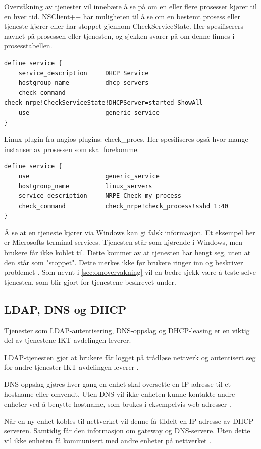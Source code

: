 Overvåkning av tjenester vil innebære å se på om en eller flere prosesser kjører til en hver tid. NSClient++ har muligheten til å se om en bestemt prosess eller tjeneste kjører eller har stoppet gjennom CheckServiceState. Her spesifiserers navnet på prosessen eller tjenesten, og sjekken svarer på om denne finnes i prosesstabellen.
\begin{lstlisting}[style=example]
define service {
    service_description     DHCP Service
    hostgroup_name          dhcp_servers
    check_command           check_nrpe!CheckServiceState!DHCPServer=started ShowAll
    use                     generic_service
}
\end{lstlisting}
Linux-plugin fra nagios-plugins: check\_procs. Her spesifiseres også hvor mange instanser av prosessen som skal forekomme. 
\begin{lstlisting}[style=example]
define service {
    use            	        generic_service
    hostgroup_name       	linux_servers
    service_description     NRPE Check my process
    check_command        	check_nrpe!check_process!sshd 1:40
}
\end{lstlisting}

Å se at en tjeneste kjører via Windows kan gi falsk informasjon. Et eksempel her er Microsofts terminal services. Tjenesten står som kjørende i Windows, men brukere får ikke koblet til. Dette kommer av at tjenesten har hengt seg, uten at den står som "stoppet". Dette merkes ikke før brukere ringer inn og beskriver problemet \cite{serviceproblem}. Som nevnt i \ref{sec:omovervakning} vil en bedre sjekk være å teste selve tjenesten, som blir gjort for tjenestene beskrevet under.

\subsection{LDAP, DNS og DHCP}
Tjenester som LDAP-autentisering, DNS-oppslag og DHCP-leasing er en viktig del av tjenestene IKT-avdelingen leverer.

LDAP-tjenesten gjør at brukere får logget på trådløse nettverk og autentisert seg for andre tjenester IKT-avdelingen leverer \cite{ldap}.

DNS-oppslag gjøres hver gang en enhet skal oversette en IP-adresse til et hostname eller omvendt. Uten DNS vil ikke enheten kunne kontakte andre enheter ved å benytte hostname, som brukes i eksempelvis web-adresser \cite{dns}. 

Når en ny enhet kobles til nettverket vil denne få tildelt en IP-adresse av DHCP-serveren. Samtidig får den informasjon om gateway og DNS-servere. Uten dette vil ikke enheten få kommunisert med andre enheter på nettverket \cite{dhcp}.

